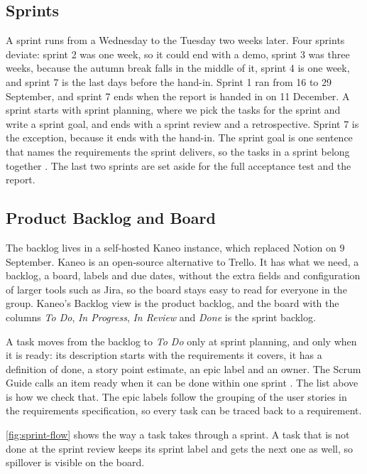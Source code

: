 \subsection{Sprints}\label{sec:method-sprints}

A sprint runs from a Wednesday to the Tuesday two weeks later. Four sprints
deviate: sprint 2 was one week, so it could end with a demo, sprint 3 was three
weeks, because the autumn break falls in the middle of it, sprint 4 is one week, and
sprint 7 is the last days before the hand-in. Sprint 1 ran from 16 to 29 September,
and sprint 7 ends when the report is handed in on 11 December. A sprint starts with sprint planning, where we pick the tasks
for the sprint and write a sprint goal, and ends with a sprint review and a retrospective.
Sprint 7 is the exception, because it ends with the hand-in.
The sprint goal is one sentence that names the requirements the sprint delivers, so
the tasks in a sprint belong together \cite[p.~10]{schwaber-scrum-guide-2016}. The
last two sprints are set aside for the full acceptance test and the report.

\subsection{Product Backlog and Board}\label{sec:method-backlog}

The backlog lives in a self-hosted Kaneo instance, which replaced Notion on
9 September. Kaneo is an open-source alternative to Trello. It has what we need, a
backlog, a board, labels and due dates, without the extra fields and configuration of
larger tools such as Jira, so the board stays easy to read for everyone in the group.
Kaneo's Backlog view is the product backlog, and the board with the columns
\emph{To Do}, \emph{In Progress}, \emph{In Review} and \emph{Done} is the sprint
backlog.

A task moves from the backlog to \emph{To Do} only at sprint planning, and only when
it is ready: its description starts with the requirements it covers, it has a
definition of done, a story point estimate, an epic label and an owner. The Scrum
Guide calls an item ready when it can be done within one sprint
\cite[p.~14]{schwaber-scrum-guide-2016}. The list above is how we check that. The epic
labels follow the grouping of the user stories in the requirements specification, so
every task can be traced back to a requirement.

\autoref{fig:sprint-flow} shows the way a task takes through a sprint. A task that is
not done at the sprint review keeps its sprint label and gets the next one as well, so
spillover is visible on the board.

